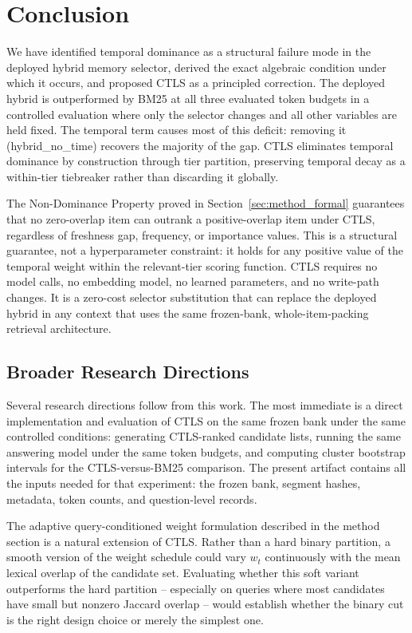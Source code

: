 \section{Conclusion}

\label{sec:conclusion}

We have identified temporal dominance as a structural failure mode in the deployed hybrid memory selector, derived the exact algebraic condition under which it occurs, and proposed CTLS as a principled correction. The deployed hybrid is outperformed by BM25 at all three evaluated token budgets in a controlled evaluation where only the selector changes and all other variables are held fixed. The temporal term causes most of this deficit: removing it (hybrid\_no\_time) recovers the majority of the gap. CTLS eliminates temporal dominance by construction through tier partition, preserving temporal decay as a within-tier tiebreaker rather than discarding it globally.

The Non-Dominance Property proved in Section~\ref{sec:method_formal} guarantees that no zero-overlap item can outrank a positive-overlap item under CTLS, regardless of freshness gap, frequency, or importance values. This is a structural guarantee, not a hyperparameter constraint: it holds for any positive value of the temporal weight within the relevant-tier scoring function. CTLS requires no model calls, no embedding model, no learned parameters, and no write-path changes. It is a zero-cost selector substitution that can replace the deployed hybrid in any context that uses the same frozen-bank, whole-item-packing retrieval architecture.

\subsection{Broader Research Directions}

\label{sec:conc_future}

Several research directions follow from this work. The most immediate is a direct implementation and evaluation of CTLS on the same frozen bank under the same controlled conditions: generating CTLS-ranked candidate lists, running the same answering model under the same token budgets, and computing cluster bootstrap intervals for the CTLS-versus-BM25 comparison. The present artifact contains all the inputs needed for that experiment: the frozen bank, segment hashes, metadata, token counts, and question-level records.

The adaptive query-conditioned weight formulation described in the method section is a natural extension of CTLS. Rather than a hard binary partition, a smooth version of the weight schedule could vary $w_t$ continuously with the mean lexical overlap of the candidate set. Evaluating whether this soft variant outperforms the hard partition -- especially on queries where most candidates have small but nonzero Jaccard overlap -- would establish whether the binary cut is the right design choice or merely the simplest one.

